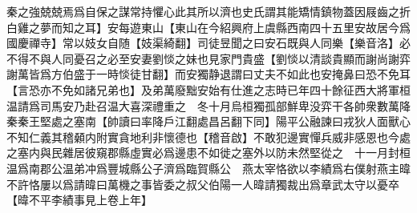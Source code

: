 秦之強兢兢焉爲自保之謀常持懼心此其所以濟也史氏謂其能矯情鎮物蓋因屐齒之折白雞之夢而知之耳】安每遊東山【東山在今紹興府上虞縣西南四十五里安故居今爲國慶禪寺】常以妓女自随【妓渠綺翻】司徒昱聞之曰安石既與人同樂【樂音洛】必不得不與人同憂召之必至安妻劉惔之妹也見家門貴盛【劉惔以清談貴顯而謝尚謝弈謝萬皆爲方伯盛于一時惔徒甘翻】而安獨静退謂曰丈夫不如此也安掩鼻曰恐不免耳【言恐亦不免如諸兄弟也】及弟萬廢黜安始有仕進之志時已年四十餘征西大將軍桓温請爲司馬安乃赴召温大喜深禮重之　冬十月烏桓獨孤部鮮卑没弈干各帥衆數萬降秦秦王堅處之塞南【帥讀曰率降戶江翻處昌呂翻下同】陽平公融諫曰戎狄人面獸心不知仁義其稽顙内附實貪地利非懷德也【稽音啟】不敢犯邊實憚兵威非感恩也今處之塞内與民雜居彼窺郡縣虛實必爲邊患不如徙之塞外以防未然堅從之　十一月封桓温爲南郡公温弟冲爲豐城縣公子濟爲臨賀縣公　燕太宰恪欲以李績爲右僕射燕主暐不許恪屢以爲請暐曰萬機之事皆委之叔父伯陽一人暐請獨裁出爲章武太守以憂卒【暐不平李績事見上卷上年】

